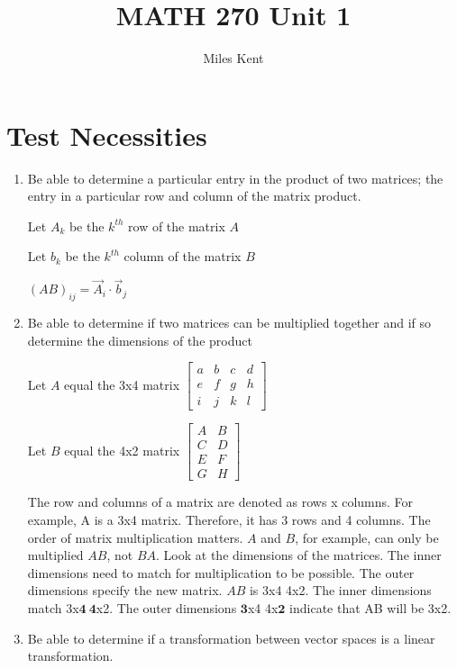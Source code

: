 \documentclass{article}
\title{MATH 270 Unit 1}
\author{Miles Kent}
\begin{document}
\maketitle

\section{Test Necessities}
\begin{enumerate}
    \item Be able to determine a particular entry in the product of two matrices; the entry in a particular row and column of the matrix product.

        Let $A_k$ be the $k^{th}$ row of the matrix $A$

        Let $b_k$ be the $k^{th}$ column of the matrix $B$

        $(AB)_{ij} = \vec{A}_i \cdot \vec{b}_j$


    \item Be able to determine if two matrices can be multiplied together and if so determine the dimensions of the product

        Let $A$ equal the 3x4 matrix
        $\begin{bmatrix}
        a & b & c & d\\
        e & f & g & h\\
        i & j & k & l
        \end{bmatrix}$

        Let $B$ equal the 4x2 matrix
        $\begin{bmatrix}
        A & B\\
        C & D\\
        E & F\\
        G & H
        \end{bmatrix}$

        The row and columns of a matrix are denoted as rows x columns.
        For example, A is a 3x4 matrix. Therefore, it has 3 rows and 4 columns.
        The order of matrix multiplication matters.
        $A$ and $B$, for example, can only be multiplied $AB$, not $BA$.
        Look at the dimensions of the matrices. The inner dimensions need to match for multiplication
        to be possible. The outer dimensions specify the new matrix.
        $AB$ is 3x4 4x2. The inner dimensions match 3x$\boldsymbol{4\ 4}$x2.
        The outer dimensions $\boldsymbol{3}$x4 4x$\boldsymbol{2}$ indicate that AB will be 3x2.

    \item Be able to determine if a transformation between vector spaces is a linear transformation.


\end{enumerate}
\end{document}
